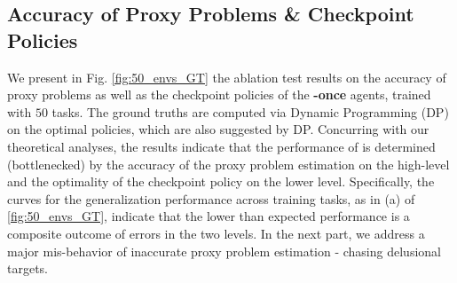 \subsection{Accuracy of Proxy Problems \& Checkpoint Policies}

We present in Fig. \ref{fig:50_envs_GT} the ablation test results on the accuracy of proxy problems as well as the checkpoint policies of the \textbf{\agentshort{}-once} agents, trained with $50$ tasks. The ground truths are computed via Dynamic Programming (DP) on the optimal policies, which are also suggested by DP. Concurring with our theoretical analyses, the results indicate that the performance of \agentshort{} is determined (bottlenecked) by the accuracy of the proxy problem estimation on the high-level and the optimality of the checkpoint policy on the lower level. Specifically, the curves for the generalization performance across training tasks, as in (a) of \ref{fig:50_envs_GT}, indicate that the lower than expected performance is a composite outcome of errors in the two levels. In the next part, we address a major mis-behavior of inaccurate proxy problem estimation - chasing delusional targets.

\begin{figure*}[htbp]
\centering
\hfill
{}
\hfill
{}
\hfill
{}
\hfill
{}

\caption{\small \textbf{\agentshort{}-once Empirical Performance \vs{} ground truths}: both the optimal policy and optimal plan variants are calculated via DP on the environment dynamics. The default deterministic setting induces the fact that combining optimal policy and optimal plan results in $1.0$ success rate. The figures suggest that the learned agent is limited by errors both in the proxy problem estimation and the checkpoint policy $\pi$. Each agent is trained with $50$ environments and each curve is processed from $20$ independent seed runs. }
\label{fig:50_envs_GT}
\end{figure*}



